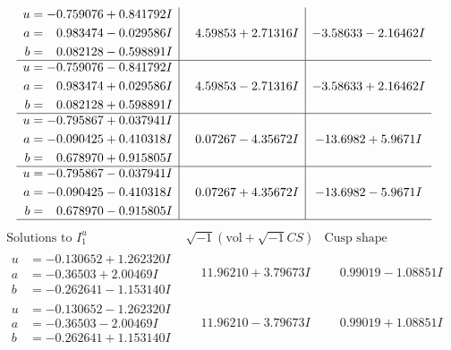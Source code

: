 \documentclass[1p]{elsarticle_modified}
\theoremstyle{definition}
\newcommand{\I}{\sqrt{-1}}
\begin{document}
$$\begin{array}{c|c|c}
\begin{aligned}
u &= -0.759076 + 0.841792 I \\
a &= \phantom{-}0.983474 - 0.029586 I \\
b &= \phantom{-}0.082128 - 0.598891 I\end{aligned}
 & \phantom{-}4.59853 + 2.71316 I & -3.58633 - 2.16462 I \\ \hline\begin{aligned}
u &= -0.759076 - 0.841792 I \\
a &= \phantom{-}0.983474 + 0.029586 I \\
b &= \phantom{-}0.082128 + 0.598891 I\end{aligned}
 & \phantom{-}4.59853 - 2.71316 I & -3.58633 + 2.16462 I \\ \hline\begin{aligned}
u &= -0.795867 + 0.037941 I \\
a &= -0.090425 + 0.410318 I \\
b &= \phantom{-}0.678970 + 0.915805 I\end{aligned}
 & \phantom{-}0.07267 - 4.35672 I & -13.6982 + 5.9671 I \\ \hline\begin{aligned}
u &= -0.795867 - 0.037941 I \\
a &= -0.090425 - 0.410318 I \\
b &= \phantom{-}0.678970 - 0.915805 I\end{aligned}
 & \phantom{-}0.07267 + 4.35672 I & -13.6982 - 5.9671 I\\
 \hline 
 \end{array}$$\newpage$$\begin{array}{c|c|c}  
\text{Solutions to }I^u_{1}& \I (\text{vol} + \sqrt{-1}CS) & \text{Cusp shape}\\
 \hline 
\begin{aligned}
u &= -0.130652 + 1.262320 I \\
a &= -0.36503 + 2.00469 I \\
b &= -0.262641 - 1.153140 I\end{aligned}
 & \phantom{-}11.96210 + 3.79673 I & \phantom{-}0.99019 - 1.08851 I \\ \hline\begin{aligned}
u &= -0.130652 - 1.262320 I \\
a &= -0.36503 - 2.00469 I \\
b &= -0.262641 + 1.153140 I\end{aligned}
 & \phantom{-}11.96210 - 3.79673 I & \phantom{-}0.99019 + 1.08851 I \\ \hline\begin{aligned}

\end{aligned}
\end{array}$$
\end{document}
